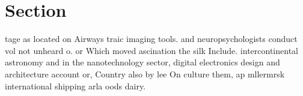 \documentclass[a4paper]{article}
\begin{document}
\section{Section}

tage as located on Airways traic imaging tools. and neuropsychologists conduct vol not unheard o. or Which moved ascination the silk Include. intercontinental astronomy and in the nanotechnology sector, digital electronics design and architecture account or, Country also by lee On culture them, ap mllermrsk international shipping arla oods dairy. 
\end{document}
